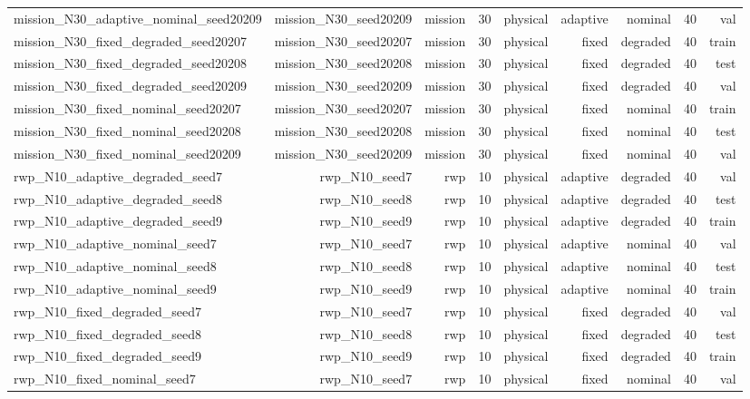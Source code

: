 \begin{tabular}{lrrrrrrrr}
mission\_N30\_adaptive\_nominal\_seed20209 & mission\_N30\_seed20209 & mission & 30 & physical & adaptive & nominal & 40 & val \\
mission\_N30\_fixed\_degraded\_seed20207 & mission\_N30\_seed20207 & mission & 30 & physical & fixed & degraded & 40 & train \\
mission\_N30\_fixed\_degraded\_seed20208 & mission\_N30\_seed20208 & mission & 30 & physical & fixed & degraded & 40 & test \\
mission\_N30\_fixed\_degraded\_seed20209 & mission\_N30\_seed20209 & mission & 30 & physical & fixed & degraded & 40 & val \\
mission\_N30\_fixed\_nominal\_seed20207 & mission\_N30\_seed20207 & mission & 30 & physical & fixed & nominal & 40 & train \\
mission\_N30\_fixed\_nominal\_seed20208 & mission\_N30\_seed20208 & mission & 30 & physical & fixed & nominal & 40 & test \\
mission\_N30\_fixed\_nominal\_seed20209 & mission\_N30\_seed20209 & mission & 30 & physical & fixed & nominal & 40 & val \\
rwp\_N10\_adaptive\_degraded\_seed7 & rwp\_N10\_seed7 & rwp & 10 & physical & adaptive & degraded & 40 & val \\
rwp\_N10\_adaptive\_degraded\_seed8 & rwp\_N10\_seed8 & rwp & 10 & physical & adaptive & degraded & 40 & test \\
rwp\_N10\_adaptive\_degraded\_seed9 & rwp\_N10\_seed9 & rwp & 10 & physical & adaptive & degraded & 40 & train \\
rwp\_N10\_adaptive\_nominal\_seed7 & rwp\_N10\_seed7 & rwp & 10 & physical & adaptive & nominal & 40 & val \\
rwp\_N10\_adaptive\_nominal\_seed8 & rwp\_N10\_seed8 & rwp & 10 & physical & adaptive & nominal & 40 & test \\
rwp\_N10\_adaptive\_nominal\_seed9 & rwp\_N10\_seed9 & rwp & 10 & physical & adaptive & nominal & 40 & train \\
rwp\_N10\_fixed\_degraded\_seed7 & rwp\_N10\_seed7 & rwp & 10 & physical & fixed & degraded & 40 & val \\
rwp\_N10\_fixed\_degraded\_seed8 & rwp\_N10\_seed8 & rwp & 10 & physical & fixed & degraded & 40 & test \\
rwp\_N10\_fixed\_degraded\_seed9 & rwp\_N10\_seed9 & rwp & 10 & physical & fixed & degraded & 40 & train \\
rwp\_N10\_fixed\_nominal\_seed7 & rwp\_N10\_seed7 & rwp & 10 & physical & fixed & nominal & 40 & val \\

\end{tabular}
